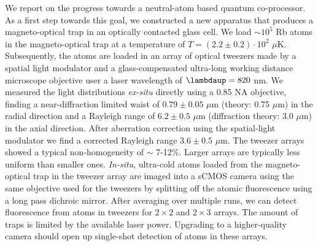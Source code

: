 \noindent We report on the progress towards a neutral-atom based quantum co-processor.
As a first step towards this goal, we constructed a new apparatus that produces a magneto-optical trap in an optically contacted glass cell. 
We load $\sim 10^5$ Rb atoms in the magneto-optical trap at a temperature of $T=(2.2\pm0.2) \cdot 10^2$ $\mu$K.
Subsequently, the atoms are loaded in an array of optical tweezers made by a spatial light modulator and a glass-compensated ultra-long working distance microscope objective user a laser wavelength of $\lambdaup = 820$ nm.
We measured the light distributions \textit{ex-situ} directly using a 0.85 NA objective, finding a near-diffraction limited waist of $0.79\pm0.05$ $\mu$m (theory: 0.75 $\mu$m) in the radial direction and a Rayleigh range of $6.2 \pm 0.5$ $\mu$m (diffraction theory: 3.0 $\mu$m) in the axial direction.
After aberration correction using the spatial-light modulator we find a corrected Rayleigh range $3.6\pm0.5$ $\mu$m.
The tweezer arrays showed a typical non-homogeneity of $\sim$ 7-12\%.
Larger arrays are typically less uniform than smaller ones. 
\textit{In-situ}, ultra-cold atoms loaded from the magneto-optical trap in the tweezer array are imaged into a sCMOS camera using the same objective used for the tweezers by splitting off the atomic fluorescence using a long pass dichroic mirror.
After averaging over multiple runs, we can detect fluorescence from atoms in tweezers for $2\times2$ and $2\times3$ arrays.
The amount of traps is limited by the available laser power. 
Upgrading to a higher-quality camera should open up single-shot detection of atoms in these arrays. 
